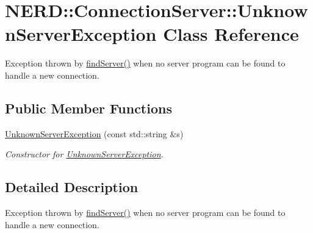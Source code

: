 \hypertarget{classNERD_1_1ConnectionServer_1_1UnknownServerException}{
\section{\-N\-E\-R\-D\-:\-:\-Connection\-Server\-:\-:\-Unknown\-Server\-Exception \-Class \-Reference}
\label{classNERD_1_1ConnectionServer_1_1UnknownServerException}
}


\-Exception thrown by \hyperlink{classNERD_1_1ConnectionServer_a9d75b0d048d374095c4d7c96e4add7f8}{find\-Server()} when no server program can be found to handle a new connection.  


\subsection*{\-Public \-Member \-Functions}
\begin{DoxyCompactItemize}
\item 
\hyperlink{classNERD_1_1ConnectionServer_1_1UnknownServerException_a776dc360b65b101756bdf5ed9ccf4f95}{\-Unknown\-Server\-Exception} (const std\-::string \&s)
\begin{DoxyCompactList}\small\item\em \-Constructor for \hyperlink{classNERD_1_1ConnectionServer_1_1UnknownServerException}{\-Unknown\-Server\-Exception}. \end{DoxyCompactList}\end{DoxyCompactItemize}


\subsection{\-Detailed \-Description}
\-Exception thrown by \hyperlink{classNERD_1_1ConnectionServer_a9d75b0d048d374095c4d7c96e4add7f8}{find\-Server()} when no server program can be found to handle a new connection. 

